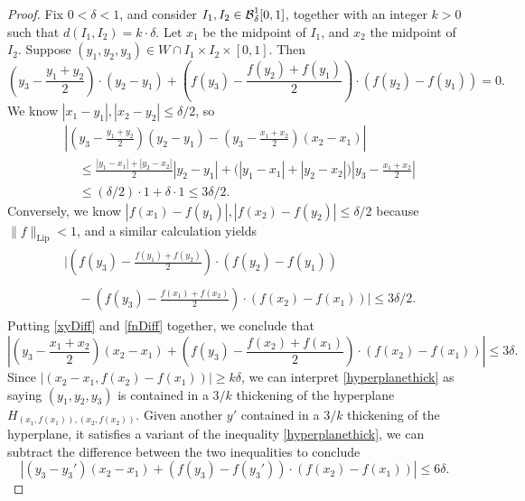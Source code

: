 \begin{proof}
	Fix $0 < \delta < 1$, and consider $I_1, I_2 \in \operatorname{\mathcal{B}}^1_\delta[0,1]$, together with an integer $k > 0$ such that $d(I_1,I_2) = k \cdot \delta$. Let $x_1$ be the midpoint of $I_1$, and $x_2$ the midpoint of $I_2$. Suppose $(y_1,y_2,y_3) \in W \cap I_1 \times I_2 \times [0,1]$. Then
	\[ \left( y_3 - \frac{y_1 + y_2}{2} \right) \cdot (y_2 - y_1) + \left( f(y_3) - \frac{f(y_2) + f(y_1)}{2} \right) \cdot (f(y_2) - f(y_1)) = 0. \]
	We know $|x_1 - y_1|, |x_2 - y_2| \leq \delta/2$, so
	\begin{align} \label{xyDiff}
		&\left| \left( y_3 - \frac{y_1 + y_2}{2} \right) (y_2 - y_1) - \left( y_3 - \frac{x_1 + x_2}{2} \right) (x_2 - x_1) \right| \nonumber\\
		&\ \ \ \ \ \leq \frac{|y_1 - x_1| + |y_2 - x_2|}{2} |y_2 - y_1| + \Big( |y_1 - x_1| + |y_2 - x_2| \Big) \left| y_3 - \frac{x_1 + x_2}{2} \right|\\
		&\ \ \ \ \ \leq (\delta/2) \cdot 1 + \delta \cdot 1 \leq 3\delta/2. \nonumber
	\end{align}
	Conversely, we know $|f(x_1) - f(y_1)|, |f(x_2) - f(y_2)| \leq \delta/2$ because $\| f \|_{\text{Lip}} < 1$, and a similar calculation yields
	\begin{align} \label{fnDiff}
	\begin{split}
		&\Big| \left( f(y_3) - \frac{f(y_1) + f(y_2)}{2} \right) \cdot (f(y_2) - f(y_1))\\
		\\&\ \ \ \ \ - \left( f(y_3) - \frac{f(x_1) + f(x_2)}{2} \right) \cdot (f(x_2) - f(x_1)) \Big|\leq 3\delta/2.
	\end{split}
	\end{align}
	Putting \eqref{xyDiff} and \eqref{fnDiff} together, we conclude that
	\begin{equation} \label{hyperplanethick}
		\left| \left( y_3 - \frac{x_1 + x_2}{2} \right) (x_2 - x_1) + \left( f(y_3) - \frac{f(x_2) + f(x_1)}{2} \right) \cdot (f(x_2) - f(x_1)) \right| \leq 3\delta.
	\end{equation}
	Since $|(x_2-x_1,f(x_2)-f(x_1))| \geq k\delta$, we can interpret \eqref{hyperplanethick} as saying $(y_1,y_2,y_3)$ is contained in a $3/k$ thickening of the hyperplane $H_{(x_1,f(x_1)), (x_2,f(x_2))}$. Given another $y'$ contained in a $3/k$ thickening of the hyperplane, it satisfies a variant of the inequality \eqref{hyperplanethick}, we can subtract the difference between the two inequalities to conclude
	\begin{equation} \label{diffinequality}
		\left| \left( y_3 - y_3' \right) (x_2 - x_1) + (f(y_3) - f(y_3')) \cdot (f(x_2) - f(x_1)) \right| \leq 6\delta.

\end{equation}
\end{proof}
